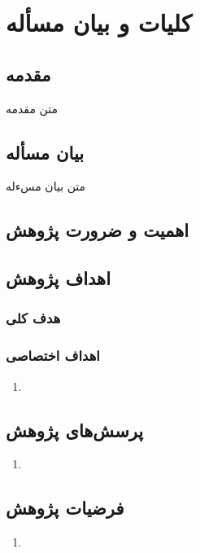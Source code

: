 
\chapter{کلیات و بیان مسأله}
\section{مقدمه}
متن مقدمه
\section{بیان مسأله}
متن بیان مسءله
\section{اهمیت و ضرورت پژوهش}

\section{اهداف پژوهش}

\subsection{هدف کلی}

\subsection{اهداف اختصاصی}
\begin{enumerate}
  \item 
\end{enumerate}

\section{پرسش‌های پژوهش}
\begin{enumerate}
  \item
\end{enumerate}

\section{فرضیات پژوهش}
\label{sec:hypotheses}
\begin{enumerate}
  \item 
\end{enumerate}

\clearpage
